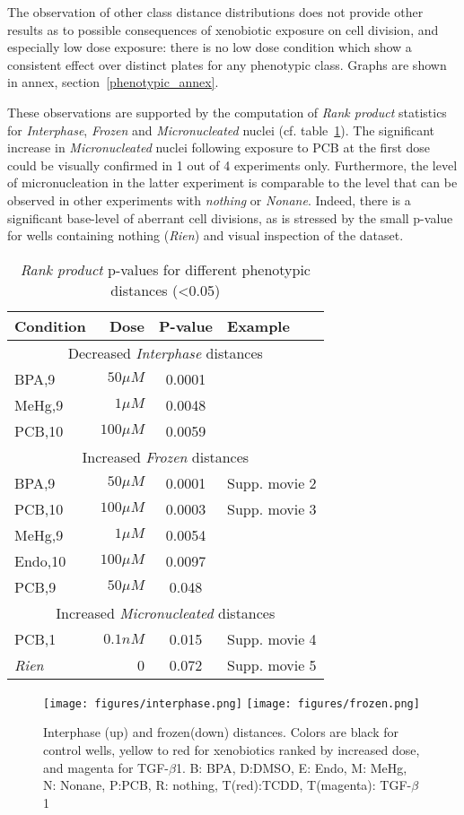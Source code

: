 The observation of other class distance distributions does not provide other results as to possible consequences of xenobiotic exposure on cell division, and especially low dose exposure: there is no low dose condition which show a consistent effect over distinct plates for any phenotypic class. Graphs are shown in annex, section~\ref{phenotypic_annex}.

These observations are supported by the computation of \textit{Rank product} statistics for \textit{Interphase}, \textit{Frozen} and \textit{Micronucleated} nuclei (cf. table~\ref{dist_pheno}). The significant increase in \textit{Micronucleated} nuclei following exposure to PCB at the first dose could be visually confirmed in 1 out of 4 experiments only. Furthermore, the level of micronucleation in the latter experiment is comparable to the level that can be observed in other experiments with \textit{nothing} or \textit{Nonane}. Indeed, there is a significant base-level of aberrant cell divisions, as is stressed by the small p-value for wells containing nothing (\textit{Rien}) and visual inspection of the dataset.
\begin{table}[!ht]
\centering
\caption{\textit{Rank product} p-values for different phenotypic distances (<0.05)}
\label{dist_pheno}
\bigskip
\begin{tabular}{|l|r|c|l|}
\hline
Condition & Dose & P-value & Example\\
\hline
\multicolumn{4}{|c|}{Decreased \textit{Interphase} distances}\\
\hline
BPA,9 &$50\mu M$ &0.0001 & \\
MeHg,9 & $1\mu M$&	0.0048&\\
PCB,10 & $100\mu M$ &0.0059&\\
\hline
\multicolumn{4}{|c|}{Increased \textit{Frozen} distances}\\
\hline
BPA,9 &$50\mu M$ &0.0001 & Supp. movie 2\\
PCB,10 & $100\mu M$ &0.0003&Supp. movie 3\\%
MeHg,9 & $1\mu M$&	0.0054&\\
Endo,10 &$100\mu M$ &0.0097&\\
PCB,9 & $50\mu M$ &0.048&\\
\hline
\multicolumn{4}{|c|}{Increased \textit{Micronucleated} distances}\\
\hline
PCB,1 & $0.1 nM$ & 0.015 & Supp. movie 4 \\ %
\textit{Rien} & 0 & 0.072 & Supp. movie 5\\ %
\hline
\end{tabular}

\end{table} 		
\begin{figure}
\caption{Interphase (up) and frozen(down) distances. Colors are black for control wells, yellow to red for xenobiotics ranked by increased dose, and magenta for TGF-$\beta$1. B: BPA, D:DMSO, E: Endo, M: MeHg, N: Nonane, P:PCB, R: nothing, T(red):TCDD, T(magenta): TGF-$\beta$1}
\centering
\label{interphase}
\texttt{[image: figures/interphase.png]}
\texttt{[image: figures/frozen.png]}
\end{figure}

